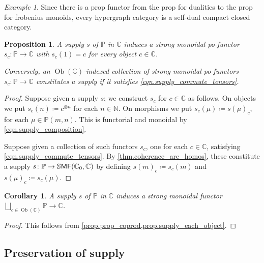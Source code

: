 \documentclass[11pt, oneside, article]{memoir}
\theoremstyle{plain}
\newtheorem{proposition}[theorem]{Proposition}
\newtheorem{corollary}[theorem]{Corollary}
\theoremstyle{definition}
\theoremstyle{remark}
\newtheorem{example}[theorem]{Example}
\newcommand{\Set}[1]{\mathrm{#1}}%
\newcommand{\Cat}[1]{{\mathsf{#1}}}%
\newcommand{\CCat}[1]{\mathbb{\StrLeft{#1}{1}}\Cat{\StrGobbleLeft{#1}{1}}}%
\DeclareMathOperator{\ob}{\Set{Ob}}
\newcommand{\tpow}[1]{^{\otimes #1}}
\newcommand{\ssmf}{\CCat{SMF}}
\newcommand{\cc}{\mathbb{C}}
\newcommand{\nn}{\mathbb{N}}
\newcommand{\pp}{\mathbb{P}}
\newcommand{\too}{\longrightarrow}
\begin{document}
\begin{example}
  Since there is a prop functor from the prop for dualities to the prop for frobenius monoids, every hypergraph category is a self-dual compact closed category.
\end{example}

\begin{proposition}\label{prop.supply_each_object}
A supply $s$ of $\pp$ in $\cc$ induces a strong monoidal po-functor $s_c\colon\pp\to\cc$ with $s_c(1)=c$ for every object $c\in\cc$. 

Conversely, an $\ob(\cc)$-indexed collection of strong monoidal po-functors $s_c\colon\pp\to\cc$ constitutes a supply if it satisfies \cref{eqn.supply_commute_tensors}.
\end{proposition}
\begin{proof}
Suppose given a supply $s$; we construct $s_c$ for $c\in\cc$ as follows. On objects we put $s_c(n)\coloneqq c\tpow{n}$ for each $n\in\nn$. On morphisms we put $s_c(\mu)\coloneqq s(\mu)_c$, for each $\mu\in\pp(m,n)$. This is functorial and monoidal by \cref{eqn.supply_composition}.

Suppose given a collection of such functors $s_c$, one for each $c\in\cc$, satisfying \cref{eqn.supply_commute_tensors}. By \cref{thm.coherence_are_homos}, these constitute a supply $s\colon\pp\to\ssmf(\cc_0,\cc)$ by defining $s(m)_c\coloneqq s_c(m)$ and $s(\mu)_c\coloneqq s_c(\mu)$.
\end{proof}

\begin{corollary} \label{cor.supply_each_object}
A supply $s$ of $\pp$ in $\cc$ induces a strong monoidal functor $\bigsqcup_{c\in\ob(\cc)}\pp\too\cc$.
\end{corollary}
\begin{proof}
This follows from \cref{prop.prop_coprod,prop.supply_each_object}.
\end{proof}

\subsection{Preservation of supply}
\end{document}
